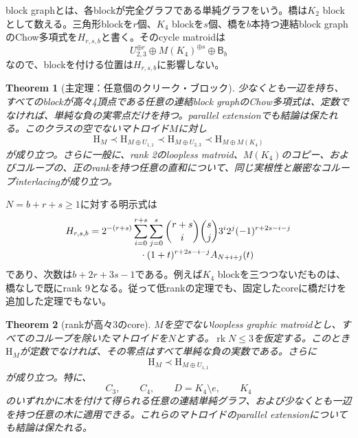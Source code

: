 \documentclass[12pt]{amsart}
\newtheorem{thm}{Theorem}[section]
\theoremstyle{definition}
\theoremstyle{remark}
\numberwithin{equation}{section}
\newcommand{\rk}{\operatorname{rk}}
\newcommand{\HCh}{\mathrm{H}}
\newcommand{\Bmat}{\mathsf{B}}
\begin{document}
block graphとは、各blockが完全グラフである単純グラフをいう。橋は$K_2$ blockとして数える。三角形blockを$r$個、$K_4$ blockを$s$個、橋を$b$本持つ連結block graphのChow多項式を$H_{r,s,b}$と書く。そのcycle matroidは
\[
 U_{2,3}^{\oplus r}\oplus M(K_4)^{\oplus s}\oplus\Bmat_b
\]
なので、blockを付ける位置は$H_{r,s,b}$に影響しない。
\begin{samepage}
\begin{thm}[主定理：任意個のクリーク・ブロック]\label{ja-block-main}
少なくとも一辺を持ち、すべてのblockが高々4頂点である任意の連結block graphのChow多項式は、定数でなければ、単純な負の実零点だけを持つ。parallel extensionでも結論は保たれる。このクラスの空でないマトロイド$M$に対し
\begin{equation}\label{ja-block-chain}
 \HCh_M\prec\HCh_{M\oplus U_{1,1}}
 \prec\HCh_{M\oplus U_{2,3}}
 \prec\HCh_{M\oplus M(K_4)}
\end{equation}
が成り立つ。さらに一般に、rank 2のloopless matroid、$M(K_4)$のコピー、およびコループの、正のrankを持つ任意の直和について、同じ実根性と厳密なコループinterlacingが成り立つ。
\end{thm}
\end{samepage}
$N=b+r+s\geq1$に対する明示式は
\begin{equation}\label{ja-block-formula}
\begin{split}
 H_{r,s,b}={}&2^{-(r+s)}
 \sum_{i=0}^{r+s}\sum_{j=0}^{s}
 \binom{r+s}{i}\binom{s}{j}3^i2^j
 (-1)^{r+2s-i-j}\\[-2pt]
 &\hspace{14mm}\cdot(1+t)^{r+2s-i-j}A_{N+i+j}(t)
\end{split}
\end{equation}
であり、次数は$b+2r+3s-1$である。例えば$K_4$ blockを三つつないだものは、橋なしで既にrank 9となる。従って低rankの定理でも、固定したcoreに橋だけを追加した定理でもない。

\begin{samepage}
\begin{thm}[rankが高々3のcore]\label{ja-main}
$M$を空でないloopless graphic matroidとし、すべてのコループを除いたマトロイドを$N$とする。$\rk N\leq3$を仮定する。このとき$\HCh_M$が定数でなければ、その零点はすべて単純な負の実数である。さらに
\[
 \HCh_M\prec \HCh_{M\oplus U_{1,1}}
\]
が成り立つ。特に、
\[
 C_3,\qquad C_4,\qquad D=K_4\setminus e,\qquad K_4
\]
のいずれかに木を付けて得られる任意の連結単純グラフ、および少なくとも一辺を持つ任意の木に適用できる。これらのマトロイドのparallel extensionについても結論は保たれる。
\end{thm}
\end{samepage}
\end{document}
